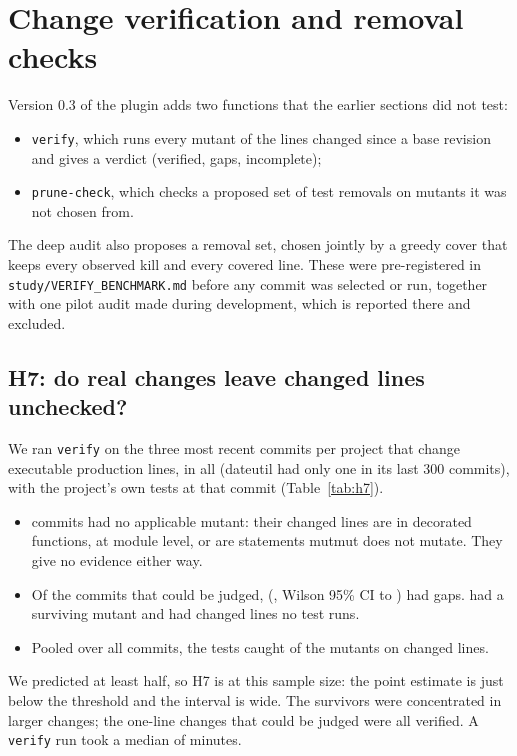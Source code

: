 \section{Change verification and removal checks}
\label{sec:verify}

Version 0.3 of the plugin adds two functions that the earlier sections did not test:
\begin{itemize}
  \item \texttt{verify}, which runs every mutant of the lines changed since a base revision and gives a verdict (verified, gaps, incomplete);
  \item \texttt{prune-check}, which checks a proposed set of test removals on mutants it was not chosen from.
\end{itemize}
The deep audit also proposes a removal set, chosen jointly by a greedy cover that keeps every observed kill and every covered line. These were pre-registered in \texttt{study/VERIFY\_BENCHMARK.md} before any commit was selected or run, together with one pilot audit made during development, which is reported there and excluded.

\subsection{H7: do real changes leave changed lines unchecked?}



We ran \texttt{verify} on the three most recent commits per project that change executable production lines, \HSevenCommits{} in all (dateutil had only one in its last 300 commits), with the project's own tests at that commit (Table~\ref{tab:h7}).
\begin{itemize}
  \item \HSevenIncomplete{} commits had no applicable mutant: their changed lines are in decorated functions, at module level, or are statements mutmut does not mutate. They give no evidence either way.
  \item Of the \HSevenJudged{} commits that could be judged, \HSevenGaps{} (\HSevenGapShare{}, Wilson 95\% CI \HSevenGapShareLo{} to \HSevenGapShareHi{}) had gaps. \HSevenWithSurvivor{} had a surviving mutant and \HSevenWithUncovered{} had changed lines no test runs.
  \item Pooled over all commits, the tests caught \HSevenRate{} of the \HSevenMutants{} mutants on changed lines.
\end{itemize}
We predicted at least half, so H7 is \HSevenSupported{} at this sample size: the point estimate is just below the threshold and the interval is wide. The survivors were concentrated in larger changes; the one-line changes that could be judged were all verified. A \texttt{verify} run took a median of \HSevenMedianMinutes{} minutes.

